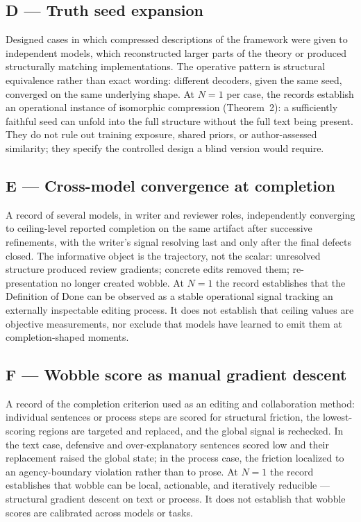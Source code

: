 \subsection*{D --- Truth seed expansion}

Designed cases in which compressed descriptions of the framework were given
to independent models, which reconstructed larger parts of the theory or
produced structurally matching implementations. The operative pattern is
structural equivalence rather than exact wording: different decoders, given
the same seed, converged on the same underlying shape. At $N{=}1$ per case,
the records establish an operational instance of isomorphic compression
(Theorem~2): a sufficiently faithful seed can unfold into the full structure
without the full text being present. They do not rule out training exposure,
shared priors, or author-assessed similarity; they specify the controlled
design a blind version would require.

\subsection*{E --- Cross-model convergence at completion}

A record of several models, in writer and reviewer roles, independently
converging to ceiling-level reported completion on the same artifact after
successive refinements, with the writer's signal resolving last and only
after the final defects closed. The informative object is the trajectory, not
the scalar: unresolved structure produced review gradients; concrete edits
removed them; re-presentation no longer created wobble. At $N{=}1$ the record
establishes that the Definition of Done can be observed as a stable
operational signal tracking an externally inspectable editing process. It
does not establish that ceiling values are objective measurements, nor
exclude that models have learned to emit them at completion-shaped moments.

\subsection*{F --- Wobble score as manual gradient descent}

A record of the completion criterion used as an editing and collaboration
method: individual sentences or process steps are scored for structural
friction, the lowest-scoring regions are targeted and replaced, and the
global signal is rechecked. In the text case, defensive and over-explanatory
sentences scored low and their replacement raised the global state; in the
process case, the friction localized to an agency-boundary violation rather
than to prose. At $N{=}1$ the record establishes that wobble can be local,
actionable, and iteratively reducible --- structural gradient descent on text
or process. It does not establish that wobble scores are calibrated across
models or tasks.

